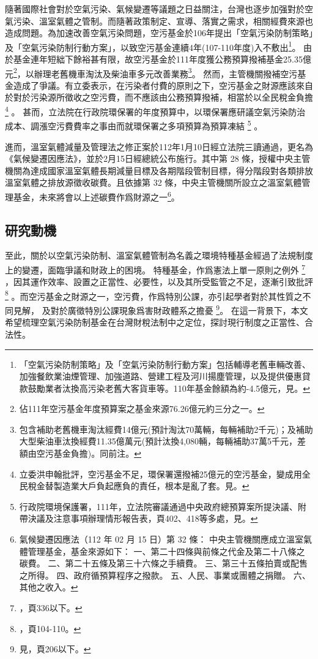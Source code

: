 \documentclass[12pt,a4paper]{article}
\begin{document}
隨著國際社會對於空氣污染、氣候變遷等議題之日益關注，台灣也逐步加强對於空氣污染、溫室氣體之管制。而隨著政策制定、宣導、落實之需求，相關經費來源也造成問題。為加速改善空氣污染問題，空污基金於106年提出「空氣污染防制策略」及「空氣污染防制行動方案」，以致空污基金連續4年(107-110年度)入不敷出\footnote{「空氣污染防制策略」及「空氣污染防制行動方案」包括輔導老舊車輛改善、加強餐飲業油煙管理、加強道路、營建工程及河川揚塵管理，以及提供優惠貸款鼓勵業者汰換高污染老舊大客貨車等。110年基金餘額為約-4.5億元，見。}。
由於基金連年短絀下餘裕甚有限，故空污基金於111年度獲公務預算撥補基金25.35億元\footnote{佔111年空污基金年度預算案之基金來源76.26億元約三分之一。}，以辦理老舊機車淘汰及柴油車多元改善業務\footnote{包含補助老舊機車淘汰經費14億元(預計淘汰70萬輛，每輛補助2千元)；及補助大型柴油車汰換經費11.35億萬元(預計汰換4,080輛，每輛補助37萬5千元，差額由空污基金負擔)。同前注。}。
然而，主管機關撥補空污基金造成了爭議。有立委表示，在污染者付費的原則之下，空污基金之財源應該來自於對於污染源所徵收之空污費，而不應該由公務預算撥補，相當於以全民稅金負擔
\footnote{立委洪申翰批評，空污基金不足，環保署還撥補25億元的空污基金，變成用全民稅金替製造業大戶負起應負的責任，根本是亂了套。見。}
。
甚而，立法院在行政院環保署的年度預算中，以環保署應研議空氣污染防治成本、調漲空污費費率之事由而就環保署之多項預算為預算凍結
\footnote{行政院環境保護署，111年，立法院審議通過中央政府總預算案所提決議、附帶決議及注意事項辦理情形報告表，頁402、418等多處，見。}
。

進而，溫室氣體減量及管理法之修正案於112年1月10日經立法院三讀通過，更名為《氣候變遷因應法》，並於2月15日經總統公布施行。其中第 28 條，授權中央主管機關為達成國家溫室氣體長期減量目標及各期階段管制目標，得分階段對各類排放溫室氣體之排放源徵收碳費。且依據第 32 條，中央主管機關所設立之溫室氣體管理基金，未來將會以上述碳費作爲財源之一\footnote{氣候變遷因應法（112 年 02 月 15 日）第 32 條：
中央主管機關應成立溫室氣體管理基金，基金來源如下：
一、第二十四條與前條之代金及第二十八條之碳費。
二、第二十五條及第三十六條之手續費。
三、第三十五條拍賣或配售之所得。
四、政府循預算程序之撥款。
五、人民、事業或團體之捐贈。
六、其他之收入。}。



\subsection{研究動機}

至此，關於以空氣污染防制、溫室氣體管制為名義之環境特種基金經過了法規制度上的變遷，面臨爭議和財政上的困境。
特種基金，作爲憲法上單一原則之例外
\footnote{，頁336以下。}
，因其運作效率、設置之正當性、必要性，以及其所受監管之不足，逐漸引致批評
\footnote{，頁104-110。}
。而空污基金之財源之一，空污費，作爲特別公課，亦引起學者對於其性質之不同見解，
及對於廣徵特別公課現象爲害財政體系之擔憂
\footnote{見，頁206以下。}。
在這一背景下，本文希望梳理空氣污染防制基金在台灣財稅法制中之定位，探討現行制度之正當性、合法性。
\end{document}
